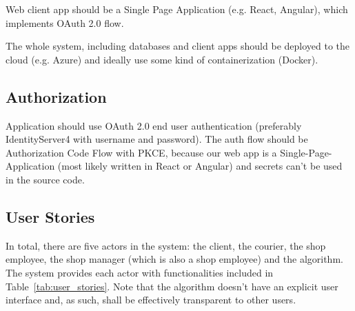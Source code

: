 \documentclass[../main.tex]{subfiles}
\begin{document}
Web client app should be a Single Page Application (e.g. React, Angular), which implements OAuth 2.0 flow.

The whole system, including databases and client apps should be deployed to the cloud (e.g. Azure) and ideally use some kind of containerization (Docker).

\subsection{Authorization}

Application should use OAuth 2.0 end user authentication (preferably IdentityServer4 with username and password). The auth flow should be Authorization Code Flow with PKCE, because our web app is a Single-Page-Application (most likely written in React or Angular) and secrets can't be used in the source code.

\subsection{User Stories}

In total, there are five actors in the system: the client, the courier, the shop employee, the shop manager (which is also a shop employee) and the algorithm. The system provides each actor with functionalities included in Table~\ref{tab:user_stories}. Note that the algorithm doesn't have an explicit user interface and, as such, shall be effectively transparent to other users. 
\end{document}
